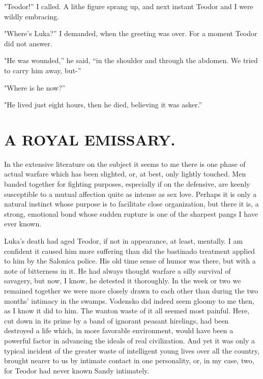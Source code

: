 \documentclass[a5paper,12pt]{book}
\begin{document}
"Teodor!” I called. A lithe figure sprang up, and next instant Teodor and I were wildly embracing. 

"Where’s Luka?” I demanded, when the greeting was over. For a moment Teodor did not answer. 

"He was wounded,” he said, “in the shoulder and through the abdomen. We tried to carry him away, but-” 

"Where is he now?” 

"He lived just eight hours, then he died, believing it was asker.”


\chapter{A ROYAL EMISSARY.}

In the extensive literature on the subject it seems to me there is one phase of actual warfare which has been slighted, or, at best, only lightly touched. Men banded together for fighting purposes, especially if on the defensive, are keenly susceptible to a mutual affection quite as intense as sex love. Perhaps it is only a natural instinct whose purpose is to facilitate close organization, but there it is, a strong, emotional bond whose sudden rupture is one of the sharpest pangs I have ever known. 

Luka’s death had aged Teodor, if not in appearance, at least, mentally. I am confident it caused him more suffering than did the bastinado treatment applied to him by the Salonica police. His old time sense of humor was there, but with a note of bitterness in it. He had always thought warfare a silly survival of savagery, but now, I know, he detested it thoroughly. In the week or two we remained together we were more closely drawn to each other than during the two months’ intimacy in the swamps. Vodensko did indeed seem gloomy to me then, as I know it did to him. The wanton waste of it all seemed most painful. Here, cut down in its prime by a band of ignorant peasant hirelings, had been destroyed a life which, in more favorable environment, would have been a powerful factor in advancing the ideals of real civilization. And yet it was only a typical incident of the greater waste of intelligent young lives over all the country, brought nearer to us by intimate contact in one personality, or, in my case, two, for Teodor had never known Sandy intimately. 
\end{document}

